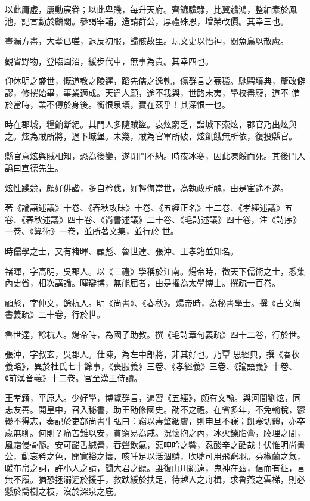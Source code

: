 \begin{pinyinscope}
 以此庸虛，屢動宸眷；以此卑賤，每升天府。齊鑣驥騄，比翼鵷鴻，整紬素於鳳池，記言動於麟閣。參謁宰輔，造請群公，厚禮殊恩，增榮改價。其幸三也。



 晝漏方盡，大耋已嗟，退反初服，歸骸故里。玩文史以怡神，閱魚鳥以散慮。



 觀省野物，登臨園沼，緩步代車，無事為貴。其幸四也。



 仰休明之盛世，慨道教之陵遲，蹈先儒之逸軌，傷群言之蕪穢。馳騁墳典，釐改僻謬，修撰始畢，事業適成。天違人願，途不我與，世路未夷，學校盡廢，道不
 備於當時，業不傳於身後。銜恨泉壤，實在茲乎！其深恨一也。



 時在郡城，糧餉斷絕。其門人多隨賊盜。哀炫窮乏，詣城下索炫，郡官乃出炫與之。炫為賊所將，過下城堡。未幾，賊為官軍所破，炫飢餓無所依，復投縣官。



 縣官意炫與賊相知，恐為後變，遂閉門不納。時夜冰寒，因此凍餒而死。其後門人謚曰宣德先生。



 炫性躁競，頗好俳諧，多自矜伐，好輕侮當世，為執政所醜，由是宦途不遂。



 著《論語述議》十卷、《春秋攻昧》十卷、《五經正名》十二卷、《孝經述議》五卷、《春秋述議》四十卷、《尚書述議》二十卷、《毛詩述議》四十卷，注《詩序》一卷、《算術》一卷，並所著文集，並行於
 世。



 時儒學之士，又有褚暉、顧彪、魯世達、張沖、王孝籍並知名。



 褚暉，字高明，吳郡人。以《三禮》學稱於江南。煬帝時，徵天下儒術之士，悉集內史省，相次講論。暉辯博，無能屈者，由是擢為太學博士。撰疏一百卷。



 顧彪，字仲文，餘杭人。明《尚書》、《春秋》。煬帝時，為秘書學士。撰《古文尚書義疏》二十卷，行於世。



 魯世達，餘杭人。煬帝時，為國子助教。撰《毛詩章句義疏》四十二卷，行於世。



 張沖，字叔玄，吳郡人。仕陳，為左中郎將，非其好也。乃覃
 思經典，撰《春秋義略》，異於杜氏七十餘事，《喪服義》三卷、《孝經義》三卷、《論語義》十卷、《前漢音義》十二卷。官至漢王侍讀。



 王孝籍，平原人。少好學，博覽群言，遍習《五經》，頗有文翰。與河間劉炫，同志友善。開皇中，召入秘書，助王劭修國史。劭不之禮。在省多年，不免輸稅，鬱鬱不得志，奏記於吏部尚書牛弘曰：竊以毒螫絪膚，則申旦不寐；飢寒切體，亦卒歲無聊。何則？痛苦難以安，貧窮易為戚。況懷抱之內，冰火鑠脂膏，腠理之間，風霜侵骨髓。安可齰舌緘脣，吞聲飲氣，惡呻吟之響，忍酸辛之酷哉！伏惟明尚書
 公，動哀矜之色，開寬裕之懷，咳唾足以活涸鱗，吹噓可用飛窮羽。芬椒蘭之氣，暖布帛之詞，許小人之請，聞大君之聽。雖復山川綿遠，鬼神在茲，信而有征，言無不履。猶恐拯溺遲於援手，救跌緩於扶足，待越人之舟楫，求魯燕之雲梯，則必懸於喬樹之枝，沒於深泉之底。




\end{pinyinscope}
